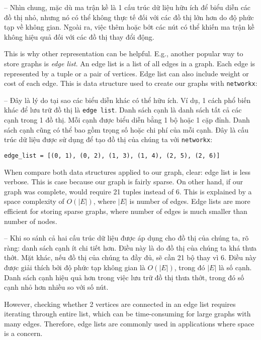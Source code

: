\documentclass{article}
\begin{document}
\begin{itemize}
\begin{itemize}
\begin{itemize}
            -- Nhìn chung, mặc dù ma trận kề là 1 cấu trúc dữ liệu hữu ích để biểu diễn các đồ thị nhỏ, nhưng nó có thể không thực tế đối với các đồ thị lớn hơn do độ phức tạp về không gian. Ngoài ra, việc thêm hoặc bớt các nút có thể khiến ma trận kề không hiệu quả đối với các đồ thị thay đổi động.

            This is why other representation can be helpful. E.g., another popular way to store graphs is {\it edge list}. An edge list is a list of all edges in a graph. Each edge is represented by a tuple or a pair of vertices. Edge list can also include weight or cost of each edge. This is data structure used to create our graphs with {\tt networkx}:

            -- Đây là lý do tại sao các biểu diễn khác có thể hữu ích. Ví dụ, 1 cách phổ biến khác để lưu trữ đồ thị là {\tt edge list}. Danh sách cạnh là danh sách tất cả các cạnh trong 1 đồ thị. Mỗi cạnh được biểu diễn bằng 1 bộ hoặc 1 cặp đỉnh. Danh sách cạnh cũng có thể bao gồm trọng số hoặc chi phí của mỗi cạnh. Đây là cấu trúc dữ liệu được sử dụng để tạo đồ thị của chúng ta với {\tt networkx}:
            \begin{verbatim}
edge_list = [(0, 1), (0, 2), (1, 3), (1, 4), (2, 5), (2, 6)]
            \end{verbatim}
            When compare both data structures applied to our graph, clear: edge list is less verbose. This is case because our graph is fairly sparse. On other hand, if our graph was complete, would require 21 tuples instead of 6. This is explained by a space complexity of $O(|E|)$, where $|E|$ is number of edges. Edge lists are more efficient for storing sparse graphs, where number of edges is much smaller than number of nodes.

            -- Khi so sánh cả hai cấu trúc dữ liệu được áp dụng cho đồ thị của chúng ta, rõ ràng: danh sách cạnh ít chi tiết hơn. Điều này là do đồ thị của chúng ta khá thưa thớt. Mặt khác, nếu đồ thị của chúng ta đầy đủ, sẽ cần 21 bộ thay vì 6. Điều này được giải thích bởi độ phức tạp không gian là $O(|E|)$, trong đó $|E|$ là số cạnh. Danh sách cạnh hiệu quả hơn trong việc lưu trữ đồ thị thưa thớt, trong đó số cạnh nhỏ hơn nhiều so với số nút.

            However, checking whether 2 vertices are connected in an edge list requires iterating through entire list, which can be time-consuming for large graphs with many edges. Therefore, edge lists are commonly used in applications where space is a concern.


\end{itemize}
\end{itemize}
\end{itemize}
\end{document}
